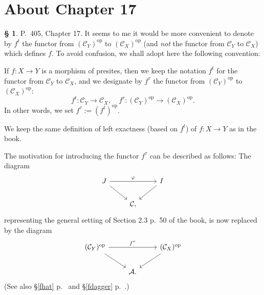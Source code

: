 \documentclass[12pt]{article}%
\theoremstyle{remark}
\theoremstyle{definition}
\newtheorem{s}[thm]{\S}%
\newcommand{\A}{\mathcal A}
\newcommand{\C}{\mathcal C}
\newcommand{\pp}{\varphi}
\DeclareMathOperator{\op}{op}
\begin{document}

\section{About Chapter 17}

\begin{s}
P.~405, Chapter 17. It seems to me it would be more convenient to denote by $f^t$ the functor from $(\C_Y)^{\op}$ to $(\C_X)^{\op}$ (and {\em not} the functor from $\C_Y$ to $\C_X$) which defines $f$. To avoid confusion, we shall adopt here the following convention:

If $f:X\to Y$ is a morphism of presites,  then we keep the notation $f^t$ for the functor from $\C_Y$ to $\C_X$, and we designate by $f^\tau$  the functor from $(\C_Y)^{\op}$ to $(\C_X)^{\op}$:
\begin{equation}\label{ttau}
f^t:\C_Y\to\C_X,\quad f^\tau:(\C_Y)^{\op}\to(\C_X)^{\op}.
\end{equation}
In other words, we set $f^\tau:=(f^t)^{\op}$. 

We keep the same definition of left exactness (based on $f^t$) of $f:X\to Y$ as in the book.

The motivation for introducing the functor $f^\tau$ can be described as follows: The diagram 
$$
\begin{tikzcd}
J\ar{dr}\ar{rr}{\pp}&&I\ar{dl}\\ 
{}&\C,
\end{tikzcd}
$$ 
representing the general setting of Section 2.3 p.~50 of the book, is now replaced by the diagram 
$$
\begin{tikzcd}
(\C_Y)^{\op}\ar{dr}\ar{rr}{f^\tau}&&(\C_X)^{\op}\ar{dl}\\ 
{}&\A.
\end{tikzcd}
$$ 
(See also \S\ref{fhat} p.~\pageref{fhat} and \S\ref{fdagger} p.~\pageref{fdagger}.)
\end{s}

%
\end{document}
